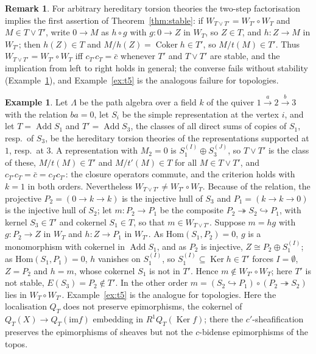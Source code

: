 \documentclass[11pt]{amsart}
\theoremstyle{definition}
\newtheorem{rem}[thm]{Remark}
\newtheorem{ex}[thm]{Example}
\newcommand{\Hom}{\mathrm{Hom}}
\newcommand{\im}{\mathrm{im}}
\begin{document}
\begin{rem}\label{rem:twostep}
For arbitrary hereditary torsion theories the two-step factorisation
implies the first assertion of Theorem~\ref{thm:stable}: if
$W_{T\vee T'}=W_{T'}\circ W_T$ and $M\in T\vee T'$, write $0\to M$ as
$h\circ g$ with $g\colon0\to Z$ in $W_T$, so $Z\in T$, and $h\colon Z\to M$
in $W_{T'}$; then $h(Z)\in T$ and $M/h(Z)=\operatorname{Coker}h\in T'$, so
$M/t(M)\in T'$. Thus $W_{T\vee T'}=W_{T'}\circ W_T$ iff $c_{T'}c_T=\bar c$
whenever $T'$ and $T\vee T'$ are stable, and the implication from left to
right holds in general; the converse fails without stability
(Example~\ref{ex:a3}), and Example~\ref{ex:t5} is the analogous failure
for topologies.
\end{rem}

\begin{ex}\label{ex:a3}
Let $\Lambda$ be the path algebra over a field $k$ of the quiver
$1\xrightarrow{a}2\xrightarrow{b}3$ with the relation $ba=0$, let $S_i$ be
the simple representation at the vertex $i$, and let $T=\operatorname{Add}
S_1$ and $T'=\operatorname{Add}S_3$, the classes of all direct sums of
copies of $S_1$, resp.\ of $S_3$, be the hereditary torsion theories of
the representations supported at $1$, resp.\ at $3$. A representation with
$M_2=0$ is $S_1^{(I)}\oplus S_3^{(J)}$, so $T\vee T'$ is the class of
these, $M/t(M)\in T'$ and $M/t'(M)\in T$ for all $M\in T\vee T'$, and
$c_{T'}c_T=\bar c=c_Tc_{T'}$: the closure operators commute, and the
criterion holds with $k=1$ in both orders. Nevertheless $W_{T\vee T'}\neq
W_{T'}\circ W_T$. Because of the relation, the projective $P_2=(0\to k\to
k)$ is the injective hull of $S_3$ and $P_1=(k\to k\to0)$ is the injective
hull of $S_2$; let $m\colon P_2\to P_1$ be the composite $P_2\twoheadrightarrow
S_2\hookrightarrow P_1$, with kernel $S_3\in T'$ and cokernel $S_1\in T$, so
that $m\in W_{T\vee T'}$. Suppose $m=hg$ with $g\colon P_2\to Z$ in $W_T$
and $h\colon Z\to P_1$ in $W_{T'}$. As $\Hom(S_1,P_2)=0$, $g$ is a
monomorphism with cokernel in $\operatorname{Add}S_1$, and as $P_2$ is
injective, $Z\cong P_2\oplus S_1^{(I)}$; as $\Hom(S_1,P_1)=0$, $h$ vanishes
on $S_1^{(I)}$, so $S_1^{(I)}\subseteq\operatorname{Ker}h\in T'$ forces
$I=\emptyset$, $Z=P_2$ and $h=m$, whose cokernel $S_1$ is not in $T'$.
Hence $m\notin W_{T'}\circ W_T$; here $T'$ is not stable, $E(S_3)=P_2\notin
T'$. In the other order $m=(S_2\hookrightarrow P_1)\circ(P_2\twoheadrightarrow
S_2)$ lies in $W_T\circ W_{T'}$. Example~\ref{ex:t5} is the analogue for
topologies. Here the localisation $Q_T$ does not preserve epimorphisms,
the cokernel of $Q_T(X)\to Q_T(\im f)$ embedding in
$R^1Q_T(\operatorname{Ker}f)$; there the $c'$-sheafification preserves the
epimorphisms of sheaves but not the $c$-bidense epimorphisms of the topos.
\end{ex}
\end{document}
